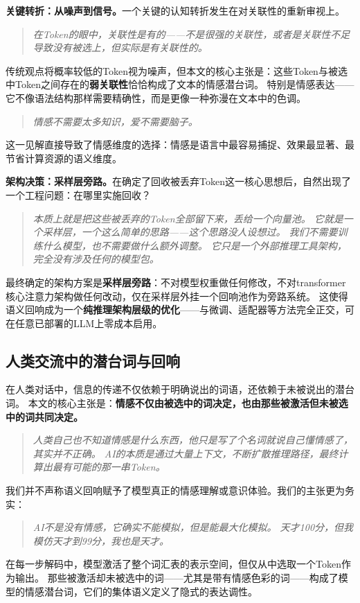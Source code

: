 \documentclass[a4paper, 11pt]{article}
\begin{document}
\textbf{关键转折：从噪声到信号。}一个关键的认知转折发生在对关联性的重新审视上。
\begin{quote}\small\itshape
在Token的眼中，关联性是有的——不是很强的关联性，或者是关联性不足导致没有被选上，但实际是有关联性的。
\end{quote}
传统观点将概率较低的Token视为噪声，但本文的核心主张是：这些Token与被选中Token之间存在的\textbf{弱关联性}恰恰构成了文本的情感潜台词。
特别是情感表达——它不像语法结构那样需要精确性，而是更像一种弥漫在文本中的色调。
\begin{quote}\small\itshape
情感不需要太多知识，爱不需要脑子。
\end{quote}
这一见解直接导致了情感维度的选择：情感是语言中最容易捕捉、效果最显著、最节省计算资源的语义维度。

\textbf{架构决策：采样层旁路。}在确定了回收被丢弃Token这一核心思想后，自然出现了一个工程问题：在哪里实施回收？
\begin{quote}\small\itshape
本质上就是把这些被丢弃的Token全部留下来，丢给一个向量池。
它就是一个采样层，一个这么简单的思路——这个思路没人设想过。
我们不需要训练什么模型，也不需要做什么额外调整。
它只是一个外部推理工具架构，完全没有涉及任何的模型包。
\end{quote}
最终确定的架构方案是\textbf{采样层旁路}：不对模型权重做任何修改，不对transformer核心注意力架构做任何改动，仅在采样层外挂一个回响池作为旁路系统。
这使得语义回响成为一个\textbf{纯推理架构层级的优化}——与微调、适配器等方法完全正交，可在任意已部署的LLM上零成本启用。

\subsection{人类交流中的潜台词与回响}

在人类对话中，信息的传递不仅依赖于明确说出的词语，还依赖于未被说出的潜台词。
本文的核心主张是：\textbf{情感不仅由被选中的词决定，也由那些被激活但未被选中的词共同决定。}
\begin{quote}\small\itshape
人类自己也不知道情感是什么东西，他只是写了个名词就说自己懂情感了，其实并不正确。
AI的本质是通过大量上下文，不断扩散推理路径，最终计算出最有可能的那一串Token。
\end{quote}
我们并不声称语义回响赋予了模型真正的情感理解或意识体验。我们的主张更为务实：
\begin{quote}\small\itshape
AI不是没有情感，它确实不能模拟，但是能最大化模拟。
天才100分，但我模仿天才到99分，我也是天才。
\end{quote}
在每一步解码中，模型激活了整个词汇表的表示空间，但仅从中选取一个Token作为输出。
那些被激活却未被选中的词——尤其是带有情感色彩的词——构成了模型的情感潜台词，它们的集体语义定义了隐式的表达调性。
\end{document}
